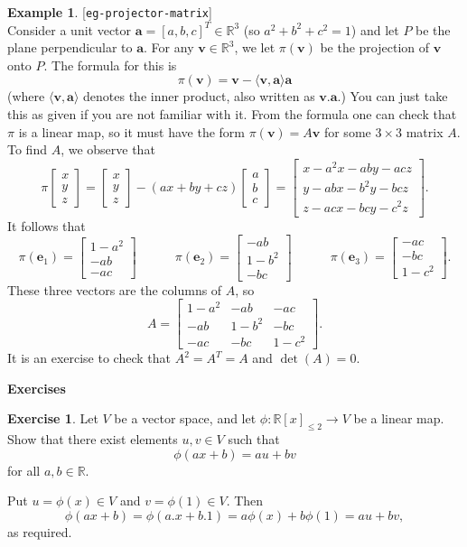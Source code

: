 \documentclass{amsart}
\newcommand{\lbl}[1]{\label{#1}\textup{[\texttt{#1}]}\ \\}
\newcommand{\lbl}{\label}
\newcommand{\R}         {{\mathbb{R}}}
\newcommand{\bsm}       {\left[\begin{smallmatrix}}
\newcommand{\esm}       {\end{smallmatrix}\right]}
\newcommand{\tm}        {\times}
\newcommand{\ip}[1]     {\langle #1\rangle}
\newcommand{\va}        {\mathbf{a}}
\newcommand{\ve}        {\mathbf{e}}
\newcommand{\vv}        {\mathbf{v}}
\renewcommand{\:}       {\colon}
\theoremstyle{definition}
\newtheorem{example}[theorem]{Example}
\newtheorem{exercise}{Exercise}[section]
\renewenvironment{solution}{\SolutionAtEnd}{\endSolutionAtEnd}
\begin{document}
\begin{example}\lbl{eg-projector-matrix}
 Consider a unit vector $\va=[a,b,c]^T\in\R^3$ (so
 $a^2+b^2+c^2=1$) and let $P$ be the plane perpendicular to
 $\va$.  For any $\vv\in\R^3$, we let $\pi(\vv)$ be the
 projection of $\vv$ onto $P$.  The formula for this is
 \[ \pi(\vv) = \vv - \ip{\vv,\va}\va \]
 (where $\ip{\vv,\va}$ denotes the inner product, also
 written as $\vv.\va$.)  You can just take this as given if
 you are not familiar with it.  From the formula one can
 check that $\pi$ is a linear map, so it must have the form
 $\pi(\vv)=A\vv$ for some $3\tm 3$ matrix $A$.  To find $A$,
 we observe that
 \[ \pi\bsm x\\ y\\ z\esm =
      \bsm x\\ y\\ z\esm - (ax+by+cz)\bsm a\\ b\\ c\esm =
      \bsm x - a^2x - aby - acz \\
           y - abx - b^2y - bcz \\
           z - acx - bcy - c^2z \esm.
 \]
 It follows that 
 \[ \pi(\ve_1) = \bsm 1-a^2\\ -ab \\ -ac\esm \hspace{3em}
    \pi(\ve_2) = \bsm -ab\\ 1-b^2 \\ -bc\esm \hspace{3em}
    \pi(\ve_3) = \bsm -ac\\ -bc \\ 1-c^2\esm.
 \]
 These three vectors are the columns of $A$, so
 \[ A = \bsm 1-a^2 & -ab & -ac \\ 
             -ab & 1-b^2 & -bc \\
             -ac & -bc & 1-c^2 \esm.
 \]
 It is an exercise to check that $A^2=A^T=A$ and $\det(A)=0$.
\end{example}


\begin{center}
 \Large \textbf{Exercises}
\end{center}

\begin{exercise}
 Let $V$ be a vector space, and let
 $\phi\:\R[x]_{\leq 2}\to V$ be a linear map.  Show that
 there exist elements $u,v\in V$ such that 
 \[ \phi(a x + b) = au + bv \]
 for all $a,b\in\R$. 
\end{exercise}
\begin{solution}
 Put $u=\phi(x)\in V$ and $v=\phi(1)\in V$.  Then
 \[ \phi(ax+b) = \phi(a.x+b.1) = a\phi(x)+b\phi(1)
     = au+bv,
 \]
 as required. 
\end{solution}
\end{document}
